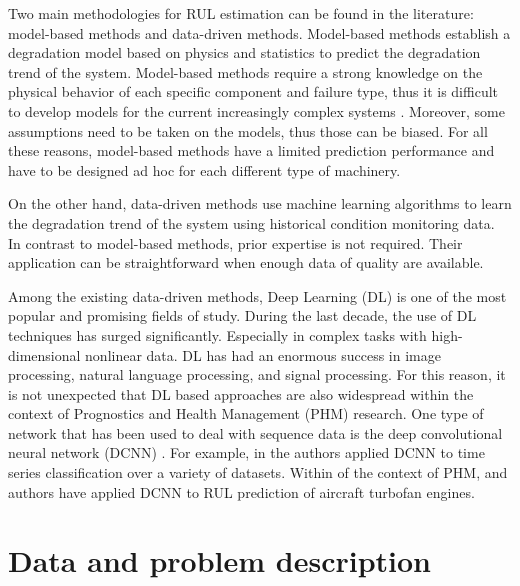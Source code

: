 \documentclass[PHM, 2021]{PHMSociety}
\begin{document}
Two main methodologies for RUL estimation can be found in the literature: model-based methods and data-driven methods. Model-based methods establish a degradation model based on physics and statistics to predict the degradation trend of the system. Model-based methods require a strong knowledge on the physical behavior of each specific component and failure type, thus it is difficult to develop models for the current increasingly complex systems \cite{zhao2017remaining}. Moreover, some assumptions need to be taken on the models, thus those can be biased. For all these reasons, model-based methods have a limited prediction performance and have to be designed ad hoc for each different type of machinery.

On the other hand, data-driven methods use machine learning algorithms to learn the degradation trend of the system using historical condition monitoring data. In contrast to model-based methods, prior expertise is not required. Their application can be straightforward when enough data of quality are available. 



Among the existing data-driven methods, Deep Learning (DL) is one of the most popular and promising fields of study. During the last decade, the use of DL techniques has surged significantly. Especially in complex tasks with high-dimensional nonlinear data. DL has had an enormous success in image processing, natural language processing, and signal processing. For this reason, it is not unexpected that DL based approaches are also widespread within the context of Prognostics and Health Management (PHM) research. One type of network that has been used to deal with sequence data is the deep convolutional neural network (DCNN) \cite{lecun1999object}. For example, in \cite{zhao2017convolutional} the authors applied DCNN to time series classification over a variety of datasets. Within of the context of PHM, \cite{babu2016deep} and \cite{li2018remaining} authors have applied DCNN to RUL prediction of aircraft turbofan engines.













\section{Data and problem description}
\end{document}
